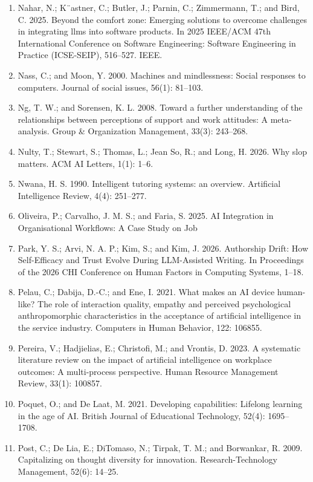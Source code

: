 \documentclass[11pt]{article}
\begin{document}
\begin{enumerate}[leftmargin=*]
  \item Nahar, N.; K¨astner, C.; Butler, J.; Parnin, C.; Zimmermann, T.; and Bird, C. 2025. Beyond the comfort zone: Emerging solutions to overcome challenges in integrating llms into software products. In 2025 IEEE/ACM 47th International Conference on Software Engineering: Software Engineering in Practice (ICSE-SEIP), 516–527. IEEE.
  \item Nass, C.; and Moon, Y. 2000. Machines and mindlessness: Social responses to computers. Journal of social issues, 56(1): 81–103.
  \item Ng, T. W.; and Sorensen, K. L. 2008. Toward a further understanding of the relationships between perceptions of support and work attitudes: A meta-analysis. Group \& Organization Management, 33(3): 243–268.
  \item Nulty, T.; Stewart, S.; Thomas, L.; Jean So, R.; and Long, H. 2026. Why slop matters. ACM AI Letters, 1(1): 1–6.
  \item Nwana, H. S. 1990. Intelligent tutoring systems: an overview. Artificial Intelligence Review, 4(4): 251–277.
  \item Oliveira, P.; Carvalho, J. M. S.; and Faria, S. 2025. AI Integration in Organisational Workflows: A Case Study on Job
  \item Park, Y. S.; Arvi, N. A. P.; Kim, S.; and Kim, J. 2026. Authorship Drift: How Self-Efficacy and Trust Evolve During LLM-Assisted Writing. In Proceedings of the 2026 CHI Conference on Human Factors in Computing Systems, 1–18.
  \item Pelau, C.; Dabija, D.-C.; and Ene, I. 2021. What makes an AI device human-like? The role of interaction quality, empathy and perceived psychological anthropomorphic characteristics in the acceptance of artificial intelligence in the service industry. Computers in Human Behavior, 122: 106855.
  \item Pereira, V.; Hadjielias, E.; Christofi, M.; and Vrontis, D. 2023. A systematic literature review on the impact of artificial intelligence on workplace outcomes: A multi-process perspective. Human Resource Management Review, 33(1): 100857.
  \item Poquet, O.; and De Laat, M. 2021. Developing capabilities: Lifelong learning in the age of AI. British Journal of Educational Technology, 52(4): 1695–1708.
  \item Post, C.; De Lia, E.; DiTomaso, N.; Tirpak, T. M.; and Borwankar, R. 2009. Capitalizing on thought diversity for innovation. Research-Technology Management, 52(6): 14–25.

\end{enumerate}
\end{document}
